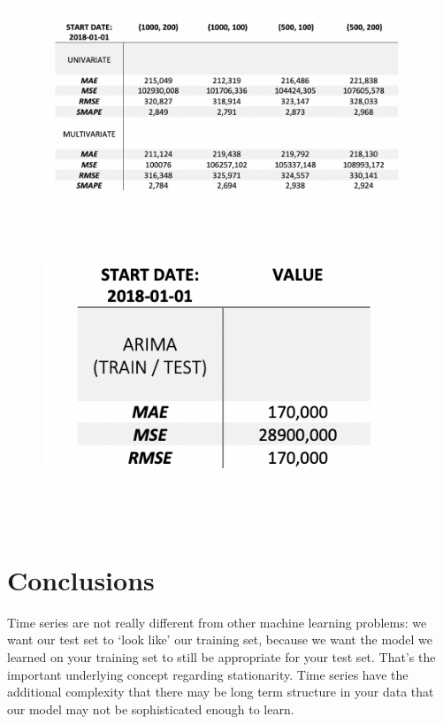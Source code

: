 \documentclass[11pt]{article}
\makeatletter
\def\maxwidth{\ifdim\Gin@nat@width>\linewidth\linewidth
    \else\Gin@nat@width\fi}
\let\Oldincludegraphics\includegraphics
\renewcommand{\includegraphics}[1]{\Oldincludegraphics[width=.8\maxwidth]{#1}}
\makeatother
\begin{document}
\begin{figure}[H]
	\centering
		\includegraphics{1_2018.png}
\end{figure} 

\begin{figure}[H]
	\centering
		\includegraphics{2_2018.png}
\end{figure} 
    

    

    

    \hypertarget{conclusions}{%
\section{Conclusions}\label{conclusions}}

    Time series are not really different from other machine learning
problems: we want our test set to `look like' our training set, because
we want the model we learned on your training set to still be
appropriate for your test set. That's the important underlying concept
regarding stationarity. Time series have the additional complexity that
there may be long term structure in your data that our model may not be
sophisticated enough to learn.
\end{document}

